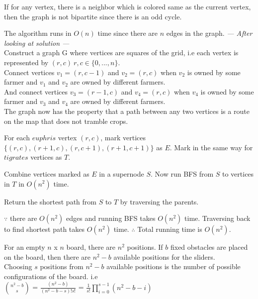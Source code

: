 \documentclass[12pt,twoside]{article}
\begin{document}
\begin{problems}
If for any vertex, there is a neighbor which is colored same as the current vertex, then the graph is not bipartite since there is an odd cycle.

The algorithm runs in $O(n)$ time since there are $n$
 edges in the graph.
\newpage
\problem  %
\textit{--- After looking at solution ---} \\

Construct a graph G where vertices are squares of the grid, i.e each vertex is represented by $(r, c)\ r,c \in \{0, ..., n\}$. \\

Connect vertices $v_1 = (r, c-1)$ and $v_2 = (r, c)$ when $v_2$ is owned by some farmer and $v_1$ and $v_2$ are owned by different farmers. \\
And connect vertices $v_3 = (r-1, c)$ and $v_4 = (r, c)$ when $v_4$ is owned by some farmer and $v_3$ and $v_4$ are owned by different farmers. \\

The graph now has the property that a path between any two vertices is a route on the map that does not tramble crops.

For each $euphris$ vertex $(r, c)$, mark vertices $\{(r, c), (r+1, c), (r, c+1), (r+1, c+1)\}$ as $E$. Mark in the same way for $tigrates$ vertices as $T$.

Combine vertices marked as $E$ in a supernode $S$. Now run BFS from $S$ to vertices in $T$ in $O(n^2)$ time. 
 
Return the shortest path from $S$ to $T$ by traversing the parents.

$\because$ there are $O(n^2)$ edges and running BFS takes $O(n^2)$ time. Traversing back to find shortest path takes $O(n^2)$ time. $\therefore$ Total running time is $O(n^2)$.


\newpage
\problem  %

\newpage
\problem  %

\begin{problemparts}
\problempart %

For an empty $n$ x $n$ board, there are $n^2$ positions. 
If $b$ fixed obstacles are placed on the board, then there are $n^2 - b$ available positions for the sliders. \\
Choosing $s$ positions from $n^2 - b$ available positions is the number of possible configurations of the board. i.e \\

$\binom{n^2-b}{s}$ =   $\frac{(n^2 - b)}{(n^2 - b - s)! s!}$ = $\frac{1}{s!}\prod_{i=0}^{s-1} (n^2 - b - i)$ 


\end{problemparts}
\end{problems}
\end{document}
